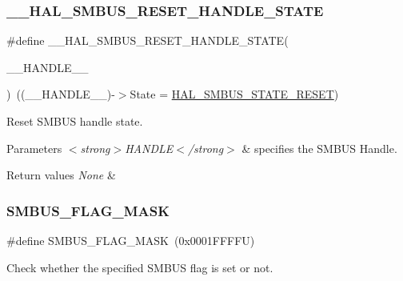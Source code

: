 \subsubsection{\texorpdfstring{\+\_\+\+\_\+\+H\+A\+L\+\_\+\+S\+M\+B\+U\+S\+\_\+\+R\+E\+S\+E\+T\+\_\+\+H\+A\+N\+D\+L\+E\+\_\+\+S\+T\+A\+TE}{\_\_HAL\_SMBUS\_RESET\_HANDLE\_STATE}}
{\footnotesize\ttfamily \#define \+\_\+\+\_\+\+H\+A\+L\+\_\+\+S\+M\+B\+U\+S\+\_\+\+R\+E\+S\+E\+T\+\_\+\+H\+A\+N\+D\+L\+E\+\_\+\+S\+T\+A\+TE(\begin{DoxyParamCaption}\item[{}]{\+\_\+\+\_\+\+H\+A\+N\+D\+L\+E\+\_\+\+\_\+ }\end{DoxyParamCaption})~((\+\_\+\+\_\+\+H\+A\+N\+D\+L\+E\+\_\+\+\_\+)-\/$>$State = \hyperlink{group___h_a_l__state__definition_ga10d0d653875df77cad851a38a0ebead9}{H\+A\+L\+\_\+\+S\+M\+B\+U\+S\+\_\+\+S\+T\+A\+T\+E\+\_\+\+R\+E\+S\+ET})}



Reset S\+M\+B\+US handle state. 


\begin{DoxyParams}{Parameters}
{\em $<$strong$>$\+H\+A\+N\+D\+L\+E$<$/strong$>$} & specifies the S\+M\+B\+US Handle. \\
\hline
\end{DoxyParams}

\begin{DoxyRetVals}{Return values}
{\em None} & \\
\hline
\end{DoxyRetVals}
\mbox{\label{group___s_m_b_u_s___exported___macros_gabcc8df77313f2c6eb892d197da66a79e}} 
\subsubsection{\texorpdfstring{S\+M\+B\+U\+S\+\_\+\+F\+L\+A\+G\+\_\+\+M\+A\+SK}{SMBUS\_FLAG\_MASK}}
{\footnotesize\ttfamily \#define S\+M\+B\+U\+S\+\_\+\+F\+L\+A\+G\+\_\+\+M\+A\+SK~(0x0001\+F\+F\+F\+F\+U)}



Check whether the specified S\+M\+B\+US flag is set or not. 


